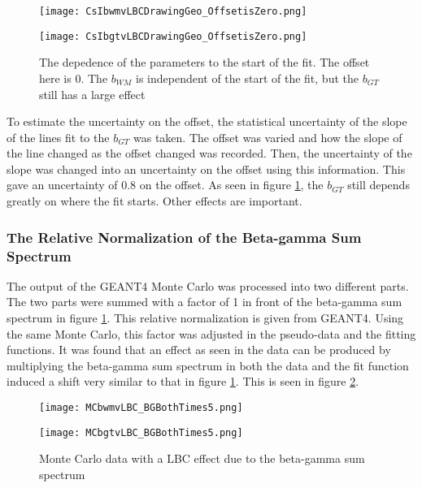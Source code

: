 \documentclass[../MaxHughesThesis.tex]{subfiles}
\begin{document}
\begin{figure}
    \centering
    \begin{minipage}{0.50\textwidth}
        \centerline{\texttt{[image: CsIbwmvLBCDrawingGeo\_OffsetisZero.png]}}
    \end{minipage}\hfill
    \begin{minipage}{0.50\textwidth}
        \centerline{\texttt{[image: CsIbgtvLBCDrawingGeo\_OffsetisZero.png]}}
    \end{minipage}
    \caption{The depedence of the parameters to the start of the fit.
	     The offset here is 0.
	     The $b_{WM}$ is independent of the start of the fit, but the $b_{GT}$ still has a large effect}
    \label{fig:offset0LBCeffect}
\end{figure}

To estimate the uncertainty on the offset, the statistical uncertainty of the slope of the lines fit to the $b_{GT}$  was taken.
The offset was varied and how the slope of the line changed as the offset changed was recorded.
Then, the uncertainty of the slope was changed into an uncertainty on the offset using this information.
This gave an uncertainty of 0.8 on the offset.
As seen in figure \ref{fig:offset0LBCeffect}, the $b_{GT}$ still depends greatly on where the fit starts.
Other effects are important. 

\subsubsection{The Relative Normalization of the Beta-gamma Sum Spectrum}

The output of the GEANT4 Monte Carlo was processed into two different parts.
The two parts were summed with a factor of 1 in front of the beta-gamma sum spectrum in figure \ref{fig:offset0LBCeffect}.
This relative normalization is given from GEANT4.
Using the same Monte Carlo, this factor was adjusted in the pseudo-data and the fitting functions.
It was found that an effect as seen in the data can be produced by multiplying the beta-gamma sum spectrum in both the data and the fit function induced a shift very similar to that in figure \ref{fig:offset0LBCeffect}.
This is seen in figure \ref{fig:MCTimes5}.    

\begin{figure}
    \centering
    \begin{minipage}{0.50\textwidth}
        \centerline{\texttt{[image: MCbwmvLBC\_BGBothTimes5.png]}}
    \end{minipage}\hfill
    \begin{minipage}{0.50\textwidth}
        \centerline{\texttt{[image: MCbgtvLBC\_BGBothTimes5.png]}}
    \end{minipage}
    \caption{Monte Carlo data with a LBC effect due to the beta-gamma sum spectrum}
    \label{fig:MCTimes5}
\end{figure}
\end{document}
